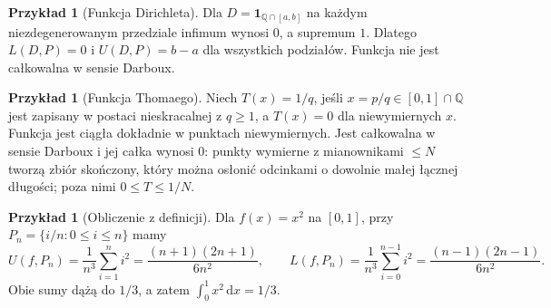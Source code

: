 \documentclass[11pt,a4paper]{article}
\numberwithin{equation}{section}
\theoremstyle{plain}
\theoremstyle{definition}
\newtheorem{przyklad}[twierdzenie]{Przykład}
\theoremstyle{remark}
\newcommand{\Q}{\mathbb Q}
\newcommand{\ind}[1]{\mathbf 1_{#1}}
\begin{document}
\begin{przyklad}[Funkcja Dirichleta]
Dla $D=\ind{\Q\cap[a,b]}$ na każdym niezdegenerowanym przedziale infimum wynosi $0$, a supremum $1$. Dlatego $L(D,P)=0$ i $U(D,P)=b-a$ dla wszystkich podziałów. Funkcja nie jest całkowalna w sensie Darboux.
\end{przyklad}
\begin{przyklad}[Funkcja Thomaego]
Niech $T(x)=1/q$, jeśli $x=p/q\in[0,1]\cap\Q$ jest zapisany w postaci nieskracalnej z $q\ge1$, a $T(x)=0$ dla niewymiernych $x$. Funkcja jest ciągła dokładnie w punktach niewymiernych. Jest całkowalna w sensie Darboux i jej całka wynosi $0$: punkty wymierne z mianownikami $\le N$ tworzą zbiór skończony, który można osłonić odcinkami o dowolnie małej łącznej długości; poza nimi $0\le T\le1/N$.
\end{przyklad}
\begin{przyklad}[Obliczenie z definicji]
Dla $f(x)=x^2$ na $[0,1]$, przy $P_n=\{i/n:0\le i\le n\}$ mamy
\[
U(f,P_n)=\frac1{n^3}\sum_{i=1}^n i^2=\frac{(n+1)(2n+1)}{6n^2},\qquad
L(f,P_n)=\frac1{n^3}\sum_{i=0}^{n-1}i^2=\frac{(n-1)(2n-1)}{6n^2}.
\]
Obie sumy dążą do $1/3$, a zatem $\int_0^1x^2\,\mathrm dx=1/3$.
\end{przyklad}
\end{document}
